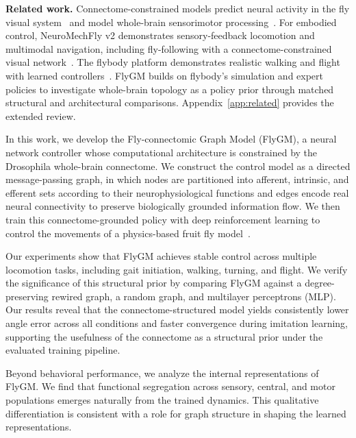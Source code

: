 \documentclass[a4paper]{easychair}
\begin{document}
\textbf{Related work.} Connectome-constrained models predict neural activity in the fly visual system~\citep{Lappalainen2024} and model whole-brain sensorimotor processing~\citep{Shiu2024}. For embodied control, NeuroMechFly v2 demonstrates sensory-feedback locomotion and multimodal navigation, including fly-following with a connectome-constrained visual network~\citep{WangChen2024}. The flybody platform demonstrates realistic walking and flight with learned controllers~\citep{Vaxenburg2025}. FlyGM builds on flybody's simulation and expert policies to investigate whole-brain topology as a policy prior through matched structural and architectural comparisons. Appendix~\ref{app:related} provides the extended review.

In this work, we develop the Fly-connectomic Graph Model (FlyGM), a neural network controller whose computational architecture is constrained by the Drosophila whole-brain connectome. We construct the control model as a directed message-passing graph, in which nodes are partitioned into afferent, intrinsic, and efferent sets according to their neurophysiological functions and edges encode real neural connectivity to preserve biologically grounded information flow. We then train this connectome-grounded policy with deep reinforcement learning to control the movements of a physics-based fruit fly model~\citep{Vaxenburg2025}.

Our experiments show that FlyGM achieves stable control across multiple locomotion tasks, including gait initiation, walking, turning, and flight. We verify the significance of this structural prior by comparing FlyGM against a degree-preserving rewired graph, a random graph, and multilayer perceptrons (MLP). Our results reveal that the connectome-structured model yields consistently lower angle error across all conditions and faster convergence during imitation learning, supporting the usefulness of the connectome as a structural prior under the evaluated training pipeline.

Beyond behavioral performance, we analyze the internal representations of FlyGM. We find that functional segregation across sensory, central, and motor populations emerges naturally from the trained dynamics. This qualitative differentiation is consistent with a role for graph structure in shaping the learned representations.
\end{document}
